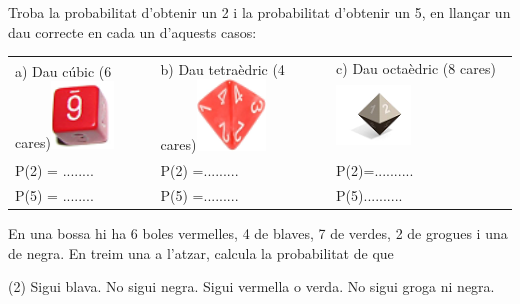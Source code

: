 \pagebreak
 \begin{mylist}

\exer \spen  Troba la probabilitat d'obtenir un 2 i la probabilitat d'obtenir un 5, en llançar un dau correcte en cada un d'aquests casos:

\begin{longtable}{p{1.5in}p{1.2in}p{1.2in}} 
	\centering 
a) Dau cúbic (6 cares)\newline \includegraphics*[bb=0 0 0.66in 0.70in, width=0.66in, height=0.70in, keepaspectratio=false]{img-04/image3.png} & b) Dau tetraèdric (4 cares)\newline \includegraphics*[bb=0 0 0.73in 0.74in, width=0.73in, height=0.74in, keepaspectratio=false]{img-04/image4.png} & c) Dau octaèdric (8 cares)\newline \includegraphics*[bb=0 0 1.13in 0.89in, width=0.78in, height=0.76in, keepaspectratio=false, trim=0.31in 0.04in 0.04in 0.09in]{img-04/image5.png} \\ [0.5cm] \quad P(2) = ........ & \quad P(2) =......... & \quad P(2)=.......... \\  [0.2cm] \quad P(5) = ........ & \quad P(5) =......... & \quad P(5).......... \\
\end{longtable}

\answers{[$P(2)=\frac{1}{6}$; $P(5)=\frac{1}{6}$,  $P(2)=\frac{1}{4}$; $P(5)=0$,  $P(2)=\frac{1}{8}$; $P(5)=\frac{1}{8}$]}


  \exer \spen En una bossa hi ha 6 boles vermelles, 4 de blaves, 7 de verdes, 2 de grogues i una de negra. En treim una a l'atzar, calcula la probabilitat de que
\begin{tasks}(2)
	\task  Sigui blava.    
	\task  No sigui negra.
	\task  Sigui vermella o verda.   
	\task  No sigui groga ni negra.
\end{tasks}
 


\end{mylist}
